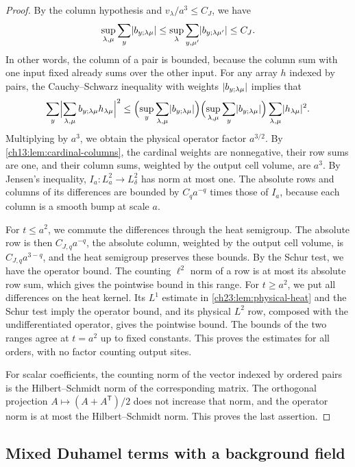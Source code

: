 \begin{proof}
By the column hypothesis and $v_\lambda/a^3\le C_J$, we have
\[
 \sup_{\lambda,\mu}\sum_y\lvert b_{y;\lambda\mu}\rvert\le\sup_\lambda\sum_{y,\mu'}\lvert b_{y;\lambda\mu'}\rvert\le C_J.
\]
In other words, the column of a pair is bounded, because the column sum with one input fixed already sums over the other input. For any array $h$ indexed by pairs, the Cauchy--Schwarz inequality with weights $\lvert b_{y;\lambda\mu}\rvert$ implies that
\[
 \sum_y\Bigl\lvert\sum_{\lambda,\mu}b_{y;\lambda\mu}h_{\lambda\mu}\Bigr\rvert^2
 \le\Bigl(\sup_y\sum_{\lambda,\mu}\lvert b_{y;\lambda\mu}\rvert\Bigr)\Bigl(\sup_{\lambda,\mu}\sum_y\lvert b_{y;\lambda\mu}\rvert\Bigr)\sum_{\lambda,\mu}\lvert h_{\lambda\mu}\rvert^2.
\]
Multiplying by $a^3$, we obtain the physical operator factor $a^{3/2}$. By \cref{ch13:lem:cardinal-columns}, the cardinal weights are nonnegative, their row sums are one, and their column sums, weighted by the output cell volume, are $a^3$. By Jensen's inequality, $I_a:L_a^2\to L_\delta^2$ has norm at most one. The absolute rows and columns of its differences are bounded by $C_qa^{-q}$ times those of $I_a$, because each column is a smooth bump at scale $a$.

For $t\le a^2$, we commute the differences through the heat semigroup. The absolute row is then $C_{J,q}a^{-q}$, the absolute column, weighted by the output cell volume, is $C_{J,q}a^{3-q}$, and the heat semigroup preserves these bounds. By the Schur test, we have the operator bound. The counting $\ell^2$ norm of a row is at most its absolute row sum, which gives the pointwise bound in this range. For $t\ge a^2$, we put all differences on the heat kernel. Its $L^1$ estimate in \cref{ch23:lem:physical-heat} and the Schur test imply the operator bound, and its physical $L^2$ row, composed with the undifferentiated operator, gives the pointwise bound. The bounds of the two ranges agree at $t=a^2$ up to fixed constants. This proves the estimates for all orders, with no factor counting output sites.

For scalar coefficients, the counting norm of the vector indexed by ordered pairs is the Hilbert--Schmidt norm of the corresponding matrix. The orthogonal projection $A\mapsto(A+A^{\mathsf T})/2$ does not increase that norm, and the operator norm is at most the Hilbert--Schmidt norm. This proves the last assertion.
\end{proof}

\subsection{Mixed Duhamel terms with a background field}

